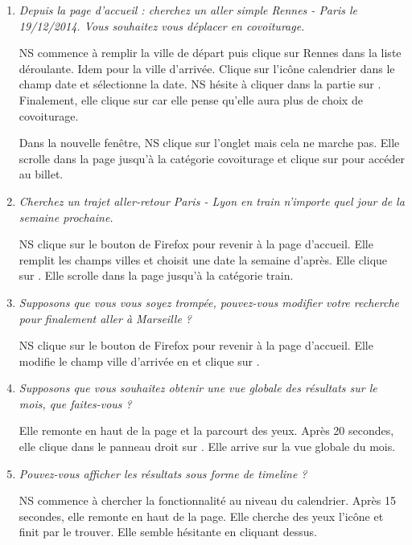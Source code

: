 \begin{enumerate}
\item \textit{Depuis la page d'accueil : cherchez un aller simple Rennes - Paris le 19/12/2014. Vous souhaitez vous d\'{e}placer en covoiturage.}

NS commence \`{a} remplir la ville de d\'{e}part puis clique sur Rennes dans la liste d\'{e}roulante. Idem pour la ville d'arriv\'{e}e.
Clique sur l'ic\^{o}ne calendrier dans le champ date et s\'{e}lectionne la date.
NS h\'{e}site \`{a} cliquer dans la partie  sur . Finalement, elle clique sur  car elle pense qu'elle aura plus de choix de covoiturage.

Dans la nouvelle fen\^{e}tre, NS clique sur l'onglet  mais cela ne marche pas.
Elle scrolle dans la page jusqu'\`{a} la cat\'{e}gorie covoiturage et clique sur  pour acc\'{e}der au billet.



\item \textit{Cherchez un trajet aller-retour Paris - Lyon en train n'importe quel jour de la semaine prochaine.} 

NS clique sur le bouton  de Firefox pour revenir \`{a} la page d'accueil.
Elle remplit les champs villes et choisit une date la semaine d'apr\`{e}s. Elle clique sur .
Elle scrolle dans la page jusqu'\`{a} la cat\'{e}gorie train.


\item \textit{Supposons que vous vous soyez tromp\'{e}e, pouvez-vous modifier votre recherche pour finalement aller \`{a} Marseille ?}

NS clique sur le bouton  de Firefox pour revenir \`{a} la page d'accueil.
Elle modifie le champ ville d'arriv\'{e}e en  et clique sur .


\item \textit{Supposons que vous souhaitez obtenir une vue globale des r\'{e}sultats sur le mois, que faites-vous ?}

Elle remonte en haut de la page et la parcourt des yeux. Apr\`{e}s 20 secondes, elle clique dans le panneau droit sur . Elle arrive sur la vue globale du mois.

\item \textit{Pouvez-vous afficher les r\'{e}sultats sous forme de timeline ?}

NS commence \`{a} chercher la fonctionnalit\'{e} au niveau du calendrier. Apr\`{e}s 15 secondes, elle remonte en haut de la page. Elle cherche des yeux l'ic\^{o}ne  et finit par le trouver. Elle semble h\'{e}sitante en cliquant dessus.



\end{enumerate}
